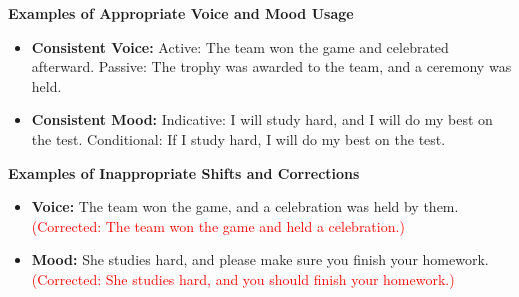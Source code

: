 \documentclass[12pt]{article}
\begin{document}
\vspace{1em}

\begin{tcolorbox}[colframe=black!60, colback=white, 
coltitle=black, colbacktitle=black!15, fonttitle=\bfseries\Large, 
title=Examples, halign title=center, left=10pt, right=10pt, top=10pt, bottom=15pt]

\textbf{Examples of Appropriate Voice and Mood Usage}
\begin{itemize}
    \item \textbf{Consistent Voice:}  
    Active: The team won the game and celebrated afterward.  
    Passive: The trophy was awarded to the team, and a ceremony was held.

    \item \textbf{Consistent Mood:}  
    Indicative: I will study hard, and I will do my best on the test.  
    Conditional: If I study hard, I will do my best on the test.  
\end{itemize}

\textbf{Examples of Inappropriate Shifts and Corrections}
\begin{itemize}
    \item \textbf{Voice:} The team won the game, and a celebration was held by them.  
    \textcolor{red}{(Corrected: The team won the game and held a celebration.)}
    \item \textbf{Mood:} She studies hard, and please make sure you finish your homework.  
    \textcolor{red}{(Corrected: She studies hard, and you should finish your homework.)}
\end{itemize}

\end{tcolorbox}

\vspace{1em}
\end{document}
